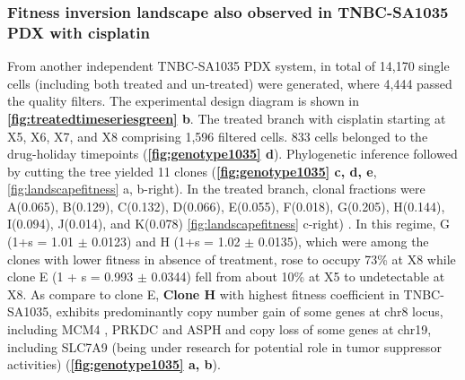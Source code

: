 \subsubsection{Fitness inversion landscape also observed in TNBC-SA1035 PDX with cisplatin}
From another independent TNBC-SA1035 PDX system, in total of 14,170 single cells (including both treated and un-treated) were generated, where 4,444 passed the quality filters. The experimental design diagram is shown in \textbf{\autoref{fig:treatedtimeseriesgreen} b}.
 The treated branch with cisplatin starting at X5, X6, X7, and X8 comprising 1,596 filtered cells. 833 cells belonged to the drug-holiday timepoints (\textbf{\autoref{fig:genotype1035} d}). Phylogenetic inference followed by cutting the tree yielded 11 clones (\textbf{\autoref{fig:genotype1035} c, d, e}, {\autoref{fig:landscapefitness} a, b-right}). In the treated branch, clonal fractions were A(0.065), B(0.129), C(0.132), D(0.066), E(0.055), F(0.018), G(0.205), H(0.144), I(0.094), J(0.014), and K(0.078) {\autoref{fig:landscapefitness} c-right}) . In this regime, G (1+s = 1.01 $\pm$ 0.0123) and H (1+s = 1.02 $\pm$ 0.0135), which were among the clones with lower fitness in absence of treatment, rose to occupy 73\% at X8 while clone E (1 + s = 0.993 $\pm$ 0.0344) fell from about 10\% at X5 to undetectable at X8. As compare to clone E,
 \textbf{Clone H} with highest fitness coefficient in TNBC-SA1035, exhibits predominantly copy number gain of some genes at chr8 locus, including MCM4 \cite {issac2019mcm2, stoeber2001dna, kwok2015prognostic}, PRKDC \cite {tan2020prkdc, sun2017prkdc, zhang2019prkdc} and ASPH and copy loss of some genes at chr19, including SLC7A9 (being under research for potential role in tumor suppressor activities) \cite {bhutia2016slc, ji2018function, broer2020amino, ganapathy2015slc5a8, gupta2006slc5a8} (\textbf{\autoref{fig:genotype1035} a, b}).
 
 
